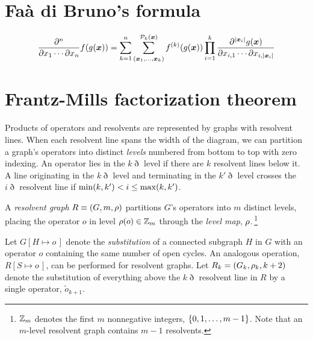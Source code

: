 \documentclass[11pt]{article}
\numberwithin{equation}{section}
\begin{document}
\appendix
\section{Fa\`a di Bruno's formula}

\begin{thm}
\begin{align}
  \pd{^n}{x_1\cd \pt x_n}
  f(g(\bm{x}))
=
  \sum_{k=1}^n
  \sum_{(\bm{x}_1,\ld,\bm{x}_k)}^{\mc{P}_k(\bm{x})}
  f\ord{k}(g(\bm{x}))
  \prod_{i=1}^k
  \pd{
    ^{|\bm{x}_i|}
    g(\bm{x})
  }{
    x_{i,1}
  \cd
    \pt
    x_{i,|\bm{x}_i|}
  }
\end{align}
\end{thm}



\section{Frantz-Mills factorization theorem}

\begin{dfn}
\label{dfn:level}
Products of operators and resolvents are represented by graphs with resolvent lines.
When each resolvent line spans the width of the diagram, we can partition a graph's operators into distinct \textit{levels} numbered from bottom to top with zero indexing.
An operator lies in the $k\eth$ level if there are $k$ resolvent lines below it.
A line originating in the $k\eth$ level and terminating in the $k'{}\eth$ level crosses the $i\eth$ resolvent line if $\mathrm{min}(k,k')<i\leq \mathrm{max}(k,k')$.
\end{dfn}

\begin{dfn}
\label{dfn:resolvent-graph}
A \textit{resolvent graph} $R\equiv(G,m,\rho )$ partitions $G$'s operators into $m$ distinct levels, placing the operator $o$ in level $\rho (o)\in\mathbb{Z}_m$ through the \textit{level map}, $\rho $.\,\footnote{
  $\mathbb{Z}_m$ denotes the first $m$ nonnegative integers,
  $
  \{
    0,1,\ldots,m-1
  \}
  $.
  Note that an $m$-level resolvent graph contains $m-1$ resolvents.
}
\end{dfn}

\begin{dfn}
Let $G[H\mapsto o\,]$ denote the \textit{substitution} of a connected subgraph $H$ in $G$ with an operator $o$ containing the same number of open cycles.
An analogous operation,
$
  R[S\mapsto o\,]
$,
can be performed for resolvent graphs.
Let
$
  R_k
=
(
  G_k,
  \rho _k,
  k+2
)
$
denote the substitution of everything above the $k\eth$ resolvent line in $R$ by a single operator, $\widetilde{o}_{k+1}$.
\end{dfn}
\end{document}
